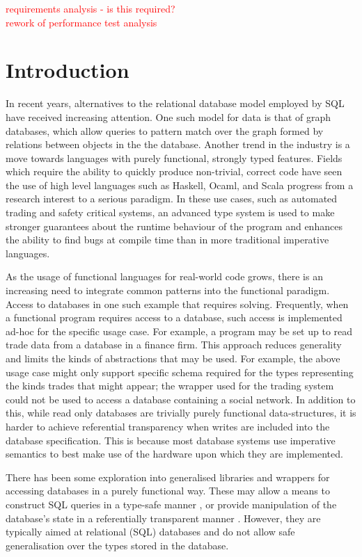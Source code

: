 \documentclass[12pt,a4paper,twoside,openright]{report}
\newcommand\todo[1]{\textcolor{red}{#1}}
\begin{document}
\pagestyle{headings}

\todo{requirements analysis - is this required?}\\
\todo{rework of performance test analysis}\\

\chapter{Introduction}
In recent years, alternatives to the relational database model employed by SQL have received increasing attention. One such model for data is that of graph databases, which allow queries to pattern match over the graph formed by relations between objects in the the database. Another trend in the industry is a move towards languages with purely functional, strongly typed features. Fields which require the ability to quickly produce non-trivial, correct code have seen the use of high level languages such as Haskell, Ocaml, and Scala progress from a research interest to a serious paradigm. In these use cases, such as automated trading and safety critical systems, an advanced type system is used to  make stronger guarantees about the runtime behaviour of the program and enhances the ability to find bugs at compile time than in more traditional imperative languages.
	
	As the usage of functional languages for real-world code grows, there is an increasing need to integrate common patterns into the functional paradigm. Access to databases in one such example that requires solving. Frequently, when a functional program requires access to a database, such access is implemented ad-hoc for the specific usage case. For example, a program may be set up to read trade data from a database in a finance firm. This approach reduces generality and limits the kinds of abstractions that may be used. For example, the above usage case might only support specific schema required for the types representing the kinds trades that might appear; the wrapper used for the trading system could not be used to access a database containing a social network. In addition to this, while read only databases are trivially purely functional data-structures, it is harder to achieve referential transparency when writes are included into the database specification. This is because most database systems use imperative semantics to best make use of the hardware upon which they are implemented.

	There has been some exploration into generalised libraries and wrappers for accessing databases in a purely functional way. These may allow a means to construct SQL queries in a type-safe manner \cite{HaskellDB}, or provide manipulation of the database’s state in a referentially transparent manner \cite{DBStates}. However, they are typically aimed at relational (SQL) databases and do not allow safe generalisation over the types stored in the database.
\end{document}
